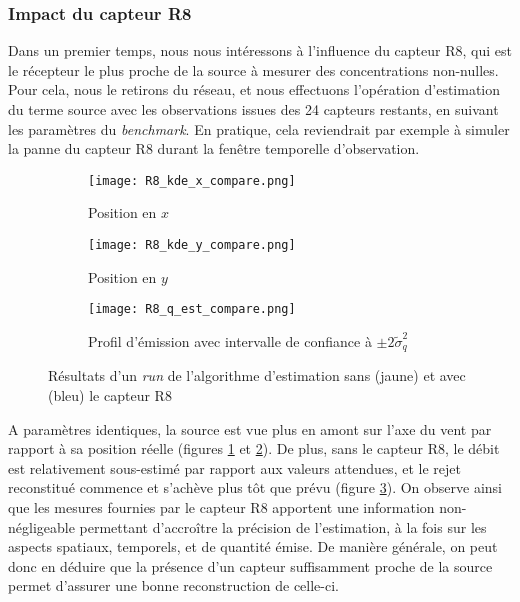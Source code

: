 \subsubsection{Impact du capteur R8}

Dans un premier temps, nous nous intéressons à l'influence du capteur R8, qui est le récepteur le plus proche de la source à mesurer des concentrations non-nulles. Pour cela, nous le retirons du réseau, et nous effectuons l'opération d'estimation du terme source avec les observations issues des 24 capteurs restants, en suivant les paramètres du \textit{benchmark}. En pratique, cela reviendrait par exemple à simuler la panne du capteur R8 durant la fenêtre temporelle d'observation.\\


\begin{figure}[h!]
	\centering
	\begin{subfigure}[t]{0.5\textwidth}
		\centering
		\texttt{[image: R8\_kde\_x\_compare.png]}
		\caption{Position en $x$}
		\label{R8_x}
	\end{subfigure}%
	\begin{subfigure}[t]{0.5\textwidth}
		\centering
		\texttt{[image: R8\_kde\_y\_compare.png]}
		\caption{Position en $y$}
		\label{R8_y}
	\end{subfigure}
	\begin{subfigure}[t]{0.65\textwidth}
		\centering
		\texttt{[image: R8\_q\_est\_compare.png]}
		\caption{Profil d'émission avec intervalle de confiance à  $\pm 2 \tilde{\sigma}_q^2$}
		\label{R8_q}
	\end{subfigure} 
	\caption{Résultats d'un \textit{run} de l'algorithme d'estimation sans (jaune) et avec (bleu) le capteur R8}
	\label{fig_R8_compare}
\end{figure}

A paramètres identiques, la source est vue plus en amont sur l'axe du vent par rapport à sa position réelle (figures \ref{R8_x} et \ref{R8_y}). De plus, sans le capteur R8, le débit est relativement sous-estimé par rapport aux valeurs attendues, et le rejet reconstitué commence et s'achève plus tôt que prévu (figure \ref{R8_q}). On observe ainsi que les mesures fournies par le capteur R8 apportent une information non-négligeable permettant d'accroître la précision de l'estimation, à la fois sur les aspects spatiaux, temporels, et de quantité émise. {De manière générale, on peut donc en déduire que la présence d'un capteur suffisamment proche de la source permet d'assurer une bonne reconstruction de celle-ci.}

